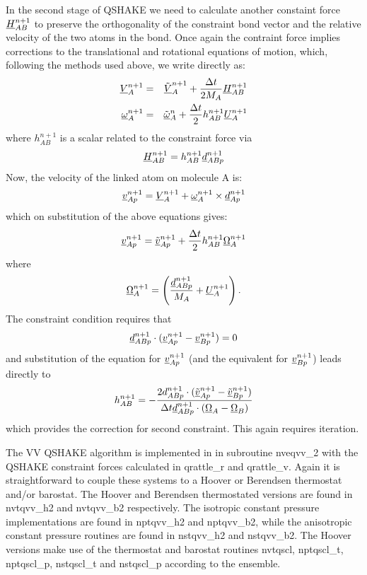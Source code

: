 In the second stage of QSHAKE we need to calculate another constaint
force $\mbox{$\underline{H}$}_{AB}^{n+1}$ to preserve the orthogonality of the
constraint bond vector and the relative velocity of the two atoms in
the bond. Once again the contraint force implies corrections to the
translational and rotational equations of motion, which, following the
methods used above, we write directly as:
\begin{eqnarray}
\mbox{$\underline{V}$}_{A}^{n+1}&=&\mbox{$\underline{\tilde{V}}$}_{A}^{n+1}+{\Delta t \over 2 M_{A}}
\mbox{$\underline{H}$}_{AB}^{n+1} \nonumber \\
\mbox{$\underline{\omega}$}_{A}^{n+1}&=&\mbox{$\underline{\tilde{\omega}}$}_{A}^{n}+
{\Delta t \over 2} h_{AB}^{n+1}\mbox{$\underline{U}$}_{A}^{n+1}
\end{eqnarray}
where $h_{AB}^{n+1}$ is a scalar related to the constraint force via
\[\mbox{$\underline{H}$}_{AB}^{n+1}=h_{AB}^{n+1}\mbox{$\underline{d}$}_{ABp}^{n+1}\]
Now, the velocity of the linked atom on molecule A is:
\begin{equation}
\mbox{$\underline{v}$}_{Ap}^{n+1}=\mbox{$\underline{V}$}_{A}^{n+1}+\mbox{$\underline{\omega}$}_{A}^{n+1}\times\mbox{$\underline{d}$}_{Ap}^{n+1}
\end{equation}
which on substitution of the above equations gives:
\begin{equation}
\mbox{$\underline{v}$}_{Ap}^{n+1}=\mbox{$\underline{\tilde{v}}$}_{Ap}^{n+1}+{\Delta t \over
2}h_{AB}^{n+1} \mbox{$\underline{\Omega}$}_{A}^{n+1}
\end{equation}
where 
\begin{equation}
\mbox{$\underline{\Omega}$}_{A}^{n+1}=\left({\mbox{$\underline{d}$}_{ABp}^{n+1} \over M_{A}}+
\mbox{$\underline{U}$}_{A}^{n+1}\right).
\end{equation}
The constraint condition requires that
\begin{equation}
\mbox{$\underline{d}$}_{ABp}^{n+1}\cdot(\mbox{$\underline{v}$}_{Ap}^{n+1}-\mbox{$\underline{v}$}_{Bp}^{n+1})=0
\end{equation}
and substitution of the equation for $\mbox{$\underline{v}$}_{Ap}^{n+1}$ (and the
equivalent for $\mbox{$\underline{v}$}_{Bp}^{n+1}$) leads directly to
\begin{equation}
h_{AB}^{n+1}=-{2d_{ABp}^{n+1}\cdot(\mbox{$\underline{\tilde{v}}$}_{Ap}^{n+1}-\mbox{$\underline{\tilde{v}}$}_{Bp}^{n+1}) \over
\Delta t \mbox{$\underline{d}$}_{ABp}^{n+1}\cdot
(\mbox{$\underline{\Omega}$}_{A}-\mbox{$\underline{\Omega}$}_{B})}
\end{equation}
which provides the correction for second constraint. This again 
requires iteration.

The VV QSHAKE algorithm is implemented in \D{} in subroutine {\sc nveqvv\_2}
with the QSHAKE constraint forces calculated
in {\sc qrattle\_r} and {\sc qrattle\_v}.
Again it is straightforward to couple these systems to a Hoover
or Berendsen thermostat and/or barostat.  The Hoover and Berendsen
thermostated versions are found in {\sc nvtqvv\_h2} and {\sc nvtqvv\_b2}
respectively. The isotropic constant pressure implementations are
found in {\sc nptqvv\_h2} and {\sc nptqvv\_b2}, while the anisotropic
constant pressure routines are found in {\sc nstqvv\_h2} and {\sc
nstqvv\_b2}. The Hoover versions make use of the thermostat and
barostat routines {\sc nvtqscl, nptqscl\_t, nptqscl\_p, nstqscl\_t}
and {\sc nstqscl\_p} according to the ensemble.
 
